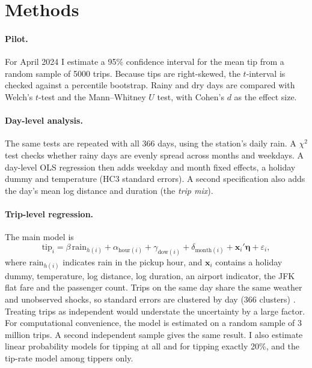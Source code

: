 \documentclass[11pt,a4paper]{article}
\begin{document}
\section{Methods}
\paragraph{Pilot.} For April 2024 I estimate a 95\% confidence interval for the mean tip from a random sample of
\num{5000} trips. Because tips are right-skewed, the $t$-interval is checked against a percentile bootstrap.
Rainy and dry days are compared with Welch's $t$-test and the Mann--Whitney $U$ test, with Cohen's $d$ as the
effect size.

\paragraph{Day-level analysis.} The same tests are repeated with all 366 days, using the station's daily rain.
A $\chi^2$ test checks whether rainy days are evenly spread across months and weekdays. A day-level OLS
regression then adds weekday and month fixed effects, a holiday dummy and temperature (HC3 standard errors). A
second specification also adds the day's mean log distance and duration (the \emph{trip mix}).

\paragraph{Trip-level regression.} The main model is
\begin{equation}
  \text{tip}_i = \beta\,\text{rain}_{h(i)} + \alpha_{\text{hour}(i)} + \gamma_{\text{dow}(i)} +
  \delta_{\text{month}(i)} + \mathbf{x}_i'\boldsymbol{\eta} + \varepsilon_i,
\end{equation}
where $\text{rain}_{h(i)}$ indicates rain in the pickup hour, and $\mathbf{x}_i$ contains a holiday dummy,
temperature, log distance, log duration, an airport indicator, the JFK flat fare and the passenger count.
Trips on the same day share the same weather and unobserved shocks, so standard errors are clustered by day (366
clusters) \cite{cameron2015}. Treating trips as independent would understate the uncertainty by a large factor.
For computational convenience, the model is estimated on a random sample of 3 million trips. A second
independent sample gives the same result. I also estimate linear probability models for tipping at all and for
tipping exactly 20\%, and the tip-rate model among tippers only.
\end{document}

